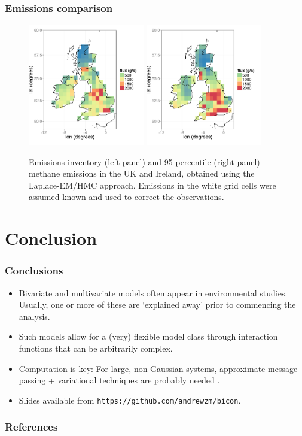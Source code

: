 \documentclass{beamer}
\begin{document}
\begin{frame}
\frametitle{Emissions comparison}

\vspace{-0.1in}

\begin{figure}
\includegraphics[width=2.0in]{NAEI_land_only.png}
\includegraphics[width=2.0in]{Em95.png}
	\caption{Emissions inventory (left panel) and 95 percentile (right panel) methane emissions in the UK and Ireland, obtained using the Laplace-EM/HMC approach. Emissions in the white grid cells were assumed known and used to correct the observations.}
\end{figure}
\end{frame}



\section{Conclusion}



\begin{frame}
\frametitle{Conclusions}

\begin{itemize}
\item Bivariate and multivariate models often appear in environmental studies. Usually, one or more of these are `explained away' prior to commencing the analysis. \vfill
\item Such models allow for a (very) flexible model class through interaction functions that can be arbitrarily complex. \vfill
\item Computation is key: For large, non-Gaussian systems, approximate message passing + variational techniques are probably needed \citep{Cseke_2014}. \vfill
\item Slides available from \texttt{https://github.com/andrewzm/bicon}.\vfill
\end{itemize}
\end{frame}

\small

\begin{frame}[allowframebreaks]
\frametitle{References}




\end{frame}
\end{document}
